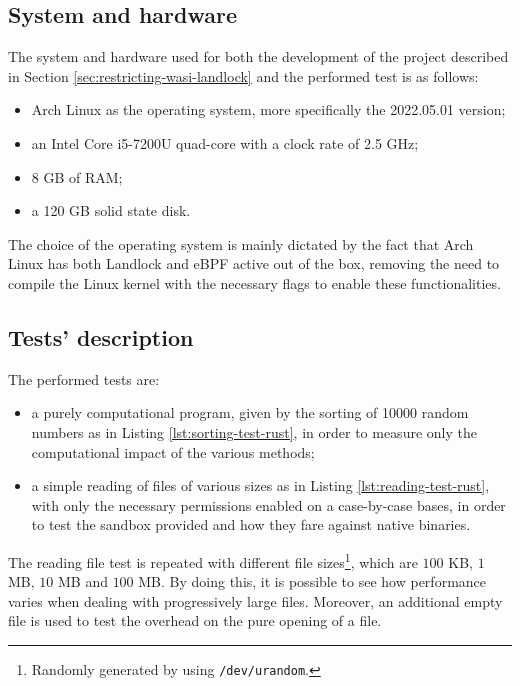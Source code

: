 \clearpage
\subsection{System and hardware}

The system and hardware used for both the development of the project described in Section \ref{sec:restricting-wasi-landlock}
and the performed test is as follows:
\begin{itemize}
  \item Arch Linux \cite{arch-linux} as the operating system, more specifically the 2022.05.01 version;
  \item an Intel Core i5-7200U quad-core with a clock rate of 2.5 GHz;
  \item 8 GB of RAM;
  \item a 120 GB solid state disk.
\end{itemize}

The choice of the operating system is mainly dictated by the fact that Arch Linux has both Landlock and eBPF active
out of the box, removing the need to compile the Linux kernel with the necessary flags to enable these
functionalities.

\subsection{Tests' description}
\label{sec:performance-test-description}

The performed tests are:
\begin{itemize}
  \item a purely computational program, given by the sorting of 10000 random numbers as in Listing \ref{lst:sorting-test-rust},
        in order to measure only the computational impact of the various methods;
  \item a simple reading of files of various sizes as in Listing \ref{lst:reading-test-rust}, with only the necessary permissions enabled on
        a case-by-case bases, in order to test the sandbox provided and how they fare against native binaries.
\end{itemize}

The reading file test is repeated with different file sizes\footnote{Randomly generated by using \texttt{/dev/urandom}.},
which are $100$ KB, $1$ MB, $10$ MB and $100$ MB. By doing this, it is possible to see how performance
varies when dealing with progressively large files. Moreover, an additional empty file is used to
test the overhead on the pure opening of a file.

